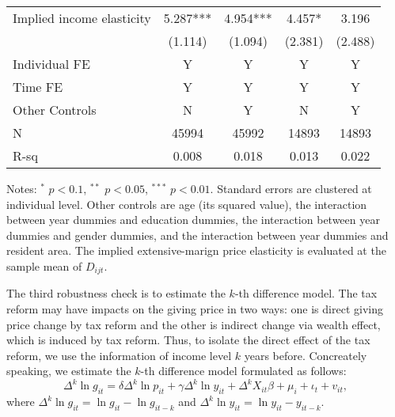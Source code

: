 \documentclass[ review  , 3p ]{elsarticle}
\begin{document}
\begin{table}
\begin{threeparttable}
\begin{tabular}[t]{lcccc}
  \hspace{1em}Implied income elasticity & 5.287*** & 4.954*** & 4.457* & 3.196\\
  \hspace{1em} & (1.114) & (1.094) & (2.381) & (2.488)\\
  \hspace{1em}Individual FE & Y & Y & Y & Y\\
  \hspace{1em}Time FE & Y & Y & Y & Y\\
  \hspace{1em}Other Controls & N & Y & N & Y\\
  \hspace{1em}N & 45994 & 45992 & 14893 & 14893\\
  \hspace{1em}R-sq & 0.008 & 0.018 & 0.013 & 0.022\\
  \bottomrule
  \end{tabular}
  \begin{tablenotes}
  \item Notes: $^{*}$ $p < 0.1$, $^{**}$ $p < 0.05$, $^{***}$ $p < 0.01$. Standard errors are clustered at individual level. Other controls are age (its squared value), the interaction between year dummies and education dummies, the interaction between year dummies and gender dummies, and the interaction between year dummies and resident area. The implied extensive-marign price elasticity is evaluated at the sample mean of $D_{ijt}$.
  \end{tablenotes}
  \end{threeparttable}
  \end{table}

  The third robustness check is to estimate the \(k\)-th difference model. The tax reform may have impacts on the giving price in two ways: one is direct giving price change by tax reform and the other is indirect change via wealth effect, which is induced by tax reform. Thus, to isolate the direct effect of the tax reform, we use the information of income level \(k\) years before.
  Concreately speaking, we estimate the \(k\)-th difference model formulated as follows:
  \[
  \Delta^k \ln g_{it} = \delta \Delta^k \ln p_{it} + \gamma \Delta^k \ln y_{it} + \Delta^k X_{it} \beta + \mu_i + \iota_t + v_{it},
  \]
  where \(\Delta^k \ln g_{it} = \ln g_{it} - \ln g_{it-k}\) and \(\Delta^k \ln y_{it} = \ln y_{it} - y_{it-k}\).
\end{document}
